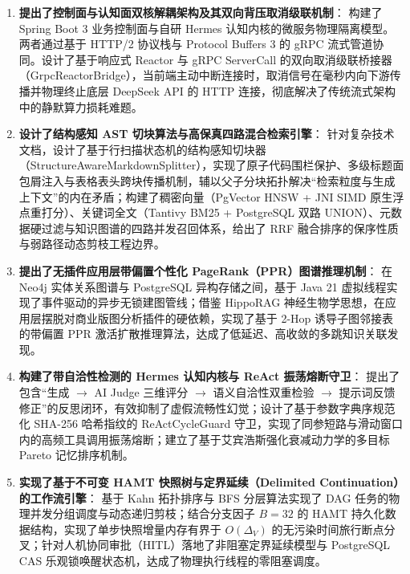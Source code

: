 \begin{enumerate}
    \item \textbf{提出了控制面与认知面双核解耦架构及其双向背压取消级联机制}：
          构建了 Spring Boot 3 业务控制面与自研 Hermes 认知内核的微服务物理隔离模型。两者通过基于 HTTP/2 协议栈与 Protocol Buffers 3 的 gRPC 流式管道协同。设计了基于响应式 Reactor 与 gRPC ServerCall 的双向取消级联桥接器（GrpcReactorBridge），当前端主动中断连接时，取消信号在毫秒内向下游传播并物理终止底层 DeepSeek API 的 HTTP 连接，彻底解决了传统流式架构中的静默算力损耗难题。

    \item \textbf{设计了结构感知 AST 切块算法与高保真四路混合检索引擎}：
          针对复杂技术文档，设计了基于行扫描状态机的结构感知切块器（StructureAwareMarkdownSplitter），实现了原子代码围栏保护、多级标题面包屑注入与表格表头跨块传播机制，辅以父子分块拓扑解决“检索粒度与生成上下文”的内在矛盾；构建了稠密向量（PgVector HNSW + JNI SIMD 原生浮点重打分）、关键词全文（Tantivy BM25 + PostgreSQL 双路 UNION）、元数据硬过滤与知识图谱的四路并发召回体系，给出了 RRF 融合排序的保序性质与弱路径动态剪枝工程边界。

    \item \textbf{提出了无插件应用层带偏置个性化 PageRank（PPR）图谱推理机制}：
          在 Neo4j 实体关系图谱与 PostgreSQL 异构存储之间，基于 Java 21 虚拟线程实现了事件驱动的异步无锁建图管线；借鉴 HippoRAG 神经生物学思想，在应用层摆脱对商业版图分析插件的硬依赖，实现了基于 2-Hop 诱导子图邻接表的带偏置 PPR 激活扩散推理算法，达成了低延迟、高收敛的多跳知识关联发现。

    \item \textbf{构建了带自洽性检测的 Hermes 认知内核与 ReAct 振荡熔断守卫}：
          提出了包含“生成 $\rightarrow$ AI Judge 三维评分 $\rightarrow$ 语义自洽性双重检验 $\rightarrow$ 提示词反馈修正”的反思闭环，有效抑制了虚假流畅性幻觉；设计了基于参数字典序规范化 SHA-256 哈希指纹的 ReActCycleGuard 守卫，实现了同参短路与滑动窗口内的高频工具调用振荡熔断；建立了基于艾宾浩斯强化衰减动力学的多目标 Pareto 记忆排序机制。

    \item \textbf{实现了基于不可变 HAMT 快照树与定界延续（Delimited Continuation）的工作流引擎}：
          基于 Kahn 拓扑排序与 BFS 分层算法实现了 DAG 任务的物理并发分组调度与动态递归剪枝；结合分支因子 $B=32$ 的 HAMT 持久化数据结构，实现了单步快照增量内存有界于 $O(\Delta_V)$ 的无污染时间旅行断点分叉；针对人机协同审批（HITL）落地了非阻塞定界延续模型与 PostgreSQL CAS 乐观锁唤醒状态机，达成了物理执行线程的零阻塞调度。
\end{enumerate}


